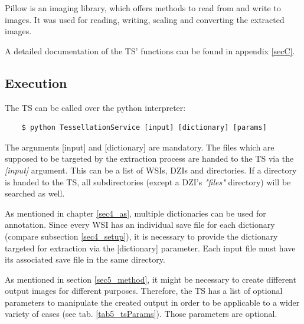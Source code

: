 Pillow is an imaging library, which offers methods to read from and write to images. It was used for reading, writing, scaling and converting the extracted images.

A detailed documentation of the TS' functions can be found in appendix \ref{secC}.

\subsection{Execution}
\label{sec5_exec}
The TS can be called over the python interpreter:

\begin{lstlisting}
	$ python TessellationService [input] [dictionary] [params]
\end{lstlisting}

The arguments [input] and [dictionary] are mandatory. The files which are supposed to be targeted by the extraction process are handed to the TS via the \emph{[input]} argument. This can be a list of WSIs, DZIs and directories. If a directory is handed to the TS, all subdirectories (except a DZI's \emph{"{\textunderscore}files"} directory) will be searched as well.

As mentioned in chapter \ref{sec4_as}, multiple dictionaries can be used for annotation. Since every WSI has an individual save file for each dictionary (compare subsection \ref{sec4_setup}), it is necessary to provide the dictionary targeted for extraction via the [dictionary] parameter. Each input file must have its associated save file in the same directory.



As mentioned in section \ref{sec5_method}, it might be necessary to create different output images for different purposes. Therefore, the TS has a list of optional parameters to manipulate the created output in order to be applicable to a wider variety of cases (see tab. \ref{tab5_tsParams}). Those parameters are optional. 

